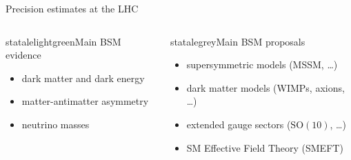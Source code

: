 \begin{frame}{Precision estimates at the LHC}
\begin{columns}
\begin{column}{0.5\textwidth}
      \begin{colorblock}[black]{statalelightgreen}{Main BSM evidence}
        \begin{itemize}
          \item dark matter and dark energy
          \item matter-antimatter asymmetry
          \item neutrino masses
        \end{itemize}
      \end{colorblock}

    \end{column}

    \begin{column}{0.5 \textwidth}

      \begin{colorblock}[black]{statalegrey}{Main BSM proposals}
        \begin{itemize}
          \item supersymmetric models (MSSM, \dots)
          \item dark matter models (WIMPs, axions, \dots)
          \item extended gauge sectors ($ \mathrm{SO}(10) $, \dots)
          \item SM Effective Field Theory (SMEFT)
        \end{itemize}
      \end{colorblock}

      \vspace{-0.7em}

      \begin{columns}

        \begin{column}{0.5\textwidth}


\end{column}
\end{columns}
\end{column}
\end{columns}
\end{frame}
